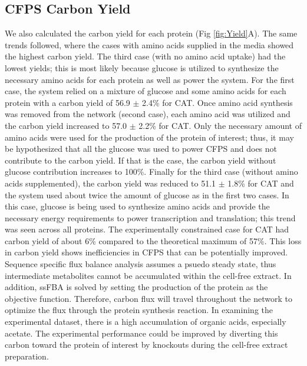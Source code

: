 \documentclass[journal=asbcd6,manuscript=article]{achemso}
\begin{document}
\subsection{CFPS Carbon Yield}
We also calculated the carbon yield for each protein (Fig \ref{fig:Yield}A).
The same trends followed, where the cases with amino acids supplied in the media showed the highest carbon yield.
The third case (with no amino acid uptake) had the lowest yields; this is most likely because glucose is utilized to synthesize the necessary amino acids for each protein as well as power the system. 
For the first case, the system relied on a mixture of glucose and some amino acids for each protein with a carbon yield of 56.9 $\pm$ 2.4\% for CAT.
Once amino acid synthesis was removed from the network (second case), each amino acid was utilized and the carbon yield increased to 57.0 $\pm$ 2.2\% for CAT.
Only the necessary amount of amino acids were used for the production of the protein of interest; thus, it may be hypothesized that all the glucose was used to power CFPS and does not contribute to the carbon yield.
If that is the case, the carbon yield without glucose contribution increases to 100\%.
Finally for the third case (without amino acids supplemented), the carbon yield was reduced to 51.1 $\pm$ 1.8\%  for CAT and the system used about twice the amount of glucose as in the first two cases.
In this case, glucose is being used to synthesize amino acids and provide the necessary energy requirements to power transcription and translation; this trend was seen across all proteins.
The experimentally constrained case for CAT had carbon yield of about 6\% compared to the theoretical maximum of 57\%.
This loss in carbon yield shows inefficiencies in CFPS that can be potentially improved.
Sequence specific flux balance analysis assumes a psuedo steady state, thus intermediate metabolites cannot be accumulated within the cell-free extract.
In addition, ssFBA is solved by setting the production of the protein as the objective function.
Therefore, carbon flux will travel throughout the network to optimize the flux through the protein synthesis reaction.
In examining the experimental dataset, there is a high accumulation of organic acids, especially acetate.
The experimental performance could be improved by diverting this carbon toward the protein of interest by knockouts during the cell-free extract preparation.    
\end{document}
